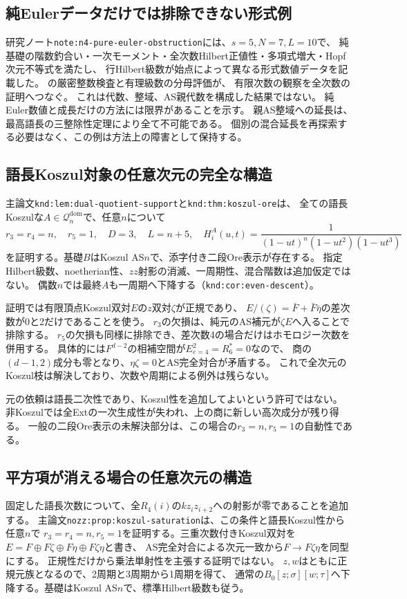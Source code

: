 \documentclass[11pt,a4paper]{ltjsarticle}
\begin{document}
\subsection{純Eulerデータだけでは排除できない形式例}
研究ノート\texttt{note:n4-pure-euler-obstruction}には、$s=5,N=7,L=10$で、
純基礎の階数釣合い・一次モーメント・全次数Hilbert正値性・多項式増大・Hopf次元不等式を満たし、
行Hilbert級数が始点によって異なる形式数値データを記載した。
の厳密整数検査と有理級数の分母評価が、
有限次数の観察を全次数の証明へつなぐ。
これは代数、整域、AS親代数を構成した結果ではない。
純Euler数値と成長だけの方法には限界があることを示す。
親AS整域への延長は、最高語長の三整除性定理により全て不可能である。
個別の混合延長を再探索する必要はなく、この例は方法上の障害として保持する。

\subsection{語長Koszul対象の任意次元の完全な構造}
主論文\texttt{knd:lem:dual-quotient-support}と\texttt{knd:thm:koszul-ore}は、
全ての語長Koszulな$A\in\mathcal Q_n^{\mathrm{dom}}$で、任意$n$について
\[
r_3=r_4=n,\quad r_5=1,\quad D=3,\quad L=n+5,\quad
H_i^A(u,t)=\frac1{(1-ut)^n(1-ut^2)(1-ut^3)}
\]
を証明する。基礎$B$はKoszul AS$n$で、添字付き二段Ore表示が存在する。
指定Hilbert級数、noetherian性、$zz$射影の消滅、一周期性、混合階数は追加仮定ではない。
偶数$n$では最終$A$も一周期へ下降する（\texttt{knd:cor:even-descent}）。

証明では有限頂点Koszul双対$E$の$z$双対$\zeta$が正規であり、
$E/(\zeta)=\bar F+\bar F\bar\eta$の差次数が0と2だけであることを使う。
$r_3$の欠損は、純元のAS補元が$\zeta E$へ入ることで排除する。
$r_5$の欠損も同様に排除でき、差次数4の場合だけはホモロジー次数を併用する。
具体的には$F^{d-2}$の相補空間が$E^2_{e=4}=R_6^*=0$なので、
商の$(d-1,2)$成分も零となり、$\eta\zeta=0$とAS完全対合が矛盾する。
これで全次元のKoszul枝は解決しており、次数や周期による例外は残らない。

元の依頼は語長二次性であり、Koszul性を追加してよいという許可ではない。
非Koszulでは全Extの一次生成性が失われ、上の商に新しい高次成分が残り得る。
一般の二段Ore表示の未解決部分は、この場合の$r_3=n,r_5=1$の自動性である。

\subsection{平方項が消える場合の任意次元の構造}
固定した語長次数について、全$R_4(i)$の$kz_iz_{i+2}$への射影が零であることを追加する。
主論文\texttt{nozz:prop:koszul-saturation}は、この条件と語長Koszul性から任意$n$で
$r_3=r_4=n,r_5=1$を証明する。三重次数付きKoszul双対を
$E=F\oplus F\zeta\oplus F\eta\oplus F\zeta\eta$と書き、
AS完全対合による次元一致から$F\to F\zeta\eta$を同型にする。
正規性だけから乗法単射性を主張する証明ではない。
$z,w$はともに正規元族となるので、2周期と3周期から1周期を得て、
通常の$B_0[z;\sigma][w;\tau]$へ下降する。基礎はKoszul AS$n$で、標準Hilbert級数も従う。
\end{document}
